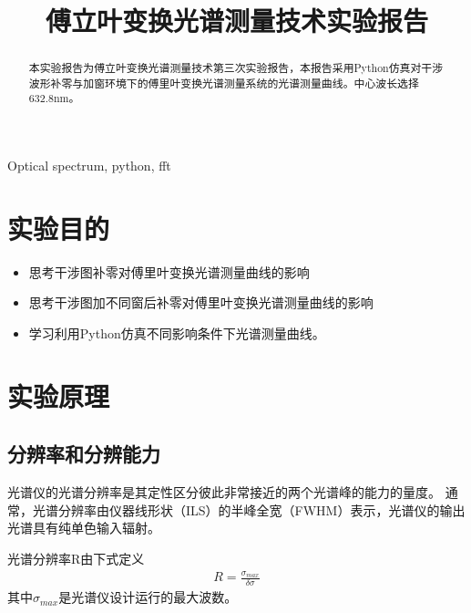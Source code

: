 \documentclass[conference]{IEEEtran}
\begin{document}
\title{傅立叶变换光谱测量技术实验报告}

\author{
}

\maketitle

\begin{abstract}
    本实验报告为傅立叶变换光谱测量技术第三次实验报告，本报告采用Python仿真对干涉波形补零与加窗环境下的傅里叶变换光谱测量系统的光谱测量曲线。中心波长选择632.8nm。
\end{abstract}

\begin{IEEEkeywords}
    Optical spectrum, python, fft
\end{IEEEkeywords}

\section{实验目的}
\begin{itemize}
    \item 思考干涉图补零对傅里叶变换光谱测量曲线的影响
    \item 思考干涉图加不同窗后补零对傅里叶变换光谱测量曲线的影响
    \item 学习利用Python仿真不同影响条件下光谱测量曲线。
\end{itemize}

\section{实验原理}

\subsection{分辨率和分辨能力}
光谱仪的光谱分辨率是其定性区分彼此非常接近的两个光谱峰的能力的量度。 通常，光谱分辨率由仪器线形状（ILS）的半峰全宽（FWHM）表示，光谱仪的输出光谱具有纯单色输入辐射。

光谱分辨率R由下式定义
\begin{align}
    R = \frac{\sigma_{max}}{\delta \sigma}
\end{align}
其中$\sigma_{max}$是光谱仪设计运行的最大波数。
\end{document}
